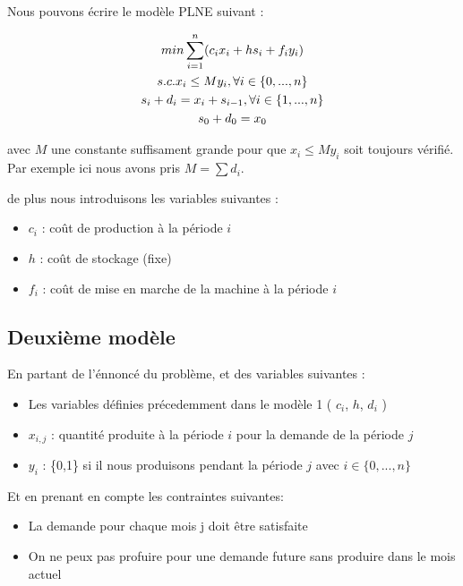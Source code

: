 \documentclass[10pt]{article}
\begin{document}
Nous pouvons écrire le modèle PLNE suivant :

\begin{multline}
    min \sum_{i=1}^{n} (c_{i}x_{i} + hs_{i} + f_iy_{i}) \\
    s.c. \space\space x_i \leq M y_i, \space\space \forall i \in \{0,...,n\} \\
    s_i + d_i = x_i + s_{i-1}, \space\space \forall i \in \{1,...,n\} \\
    s_0 + d_0 = x_0 \\
\end{multline}

avec $M$ une constante suffisament grande pour que $x_i \leq M y_i$ soit toujours vérifié. Par exemple ici nous avons pris $M = \sum{d_i}$.

de plus nous introduisons les variables suivantes :

\begin{itemize}
  \item $c_{i}$ : coût de production à la période $i$
  \item $h$ : coût de stockage (fixe)
  \item $f_{i}$ : coût de mise en marche de la machine à la période $i$
\end{itemize}

\subsection*{Deuxième modèle}
En partant de l'énnoncé du problème, et des variables suivantes :

\begin{itemize}
  \item Les variables définies précedemment dans le modèle 1 ( $c_{i}$, $h$, $d_{i}$ )
  \item $x_{i,j}$ : quantité produite à la période $i$ pour la demande de la période $j$
  \item $y_{i}$ : \{0,1\} si il nous produisons pendant la période $j$
avec $i \in \{0,..., n\}$
\end{itemize}

Et en prenant en compte les contraintes suivantes:

\begin{itemize}
  \item La demande pour chaque mois j doit être satisfaite
  \item On ne peux pas profuire pour une demande future sans produire dans le mois actuel
\end{itemize}
\end{document}
